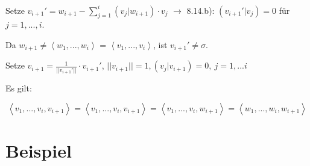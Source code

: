 \documentclass[a4paper, openany]{book}
\begin{document}
        \par \medskip

        Setze $v_{i+1}' = w_{i+1} - \sum_{j=1}^i (v_j | w_{i+1}) \cdot v_j$ $\rightarrow$ 8.14.b): $(v_{i+1}' | v_j) = 0$ für $j = 1, ..., i$.

        \par \medskip

        Da $w_{i+1} \neq \left \langle w_1, ..., w_i \right \rangle$ = $\left \langle v_1, ..., v_i \right \rangle$, ist $v_{i+1}' \neq \sigma$.


        \par \medskip

        Setze $v_{i+1} = \frac{1}{||v_{i+1}'||} \cdot v_{i+1}'$, $||v_{i+1}|| = 1, (v_j | v_{i+1}) = 0, \ j=1,...i$

        \par \medskip

        Es gilt:

        \[ \left \langle v_1, ..., v_i, v_{i+1} \right \rangle = \left \langle v_1, ..., v_i, v_{i+1} \right \rangle = \left \langle v_1, ..., v_i, w_{i+1} \right \rangle = \left \langle w_1, ..., w_i, w_{i+1} \right \rangle \]

        \section{Beispiel}
\end{document}
